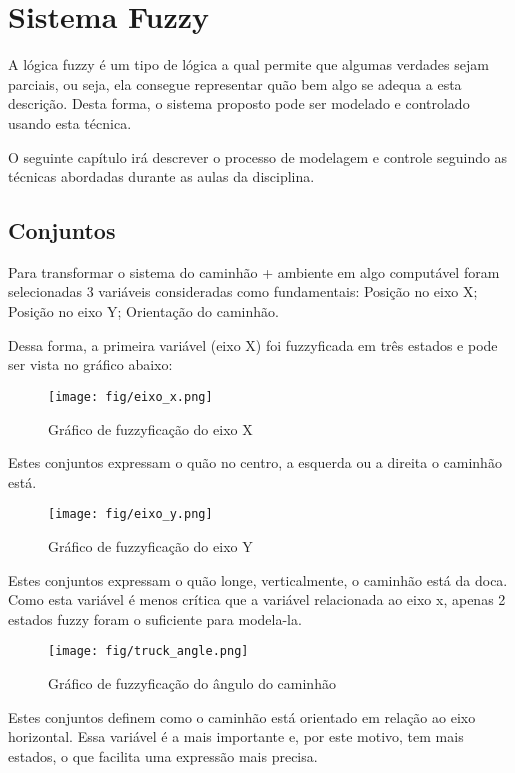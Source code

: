 \documentclass [12pt, a4paper] {article}
\begin{document}
\newpage
\section{Sistema Fuzzy }
A lógica fuzzy é um tipo de lógica a qual permite que algumas verdades sejam parciais, ou seja, ela consegue representar quão bem algo se adequa a esta descrição. Desta forma, o sistema proposto pode ser modelado e controlado usando esta técnica. \par

O seguinte capítulo irá descrever o processo de modelagem e controle seguindo as técnicas abordadas durante as aulas da disciplina.

\subsection{Conjuntos}
Para transformar o sistema do caminhão + ambiente em algo computável foram selecionadas 3 variáveis consideradas como fundamentais: Posição no eixo X; Posição no eixo Y; Orientação do caminhão.\par
Dessa forma, a primeira variável (eixo X) foi fuzzyficada em três estados e pode ser vista no gráfico abaixo:

\begin{figure}[H]
    \centering
    \texttt{[image: fig/eixo\_x.png]}
    \caption{Gráfico de fuzzyficação do eixo X}
    \label{fig:axioms}
\end{figure}
Estes conjuntos expressam o quão no centro, a esquerda ou a direita o caminhão está.

\begin{figure}[H]
    \centering
    \texttt{[image: fig/eixo\_y.png]}
    \caption{Gráfico de fuzzyficação do eixo Y}
    \label{fig:axioms}
\end{figure}
Estes conjuntos expressam o quão longe, verticalmente, o caminhão está da doca. Como esta variável é menos crítica que a variável relacionada ao eixo x, apenas 2 estados fuzzy foram o suficiente para modela-la.

\begin{figure}[H]
    \centering
    \texttt{[image: fig/truck\_angle.png]}
    \caption{Gráfico de fuzzyficação do ângulo do caminhão}
    \label{fig:axioms}
\end{figure}
Estes conjuntos definem como o caminhão está orientado em relação ao eixo horizontal. Essa variável é a mais importante e, por este motivo, tem mais estados, o que facilita uma expressão mais precisa.
\end{document}
